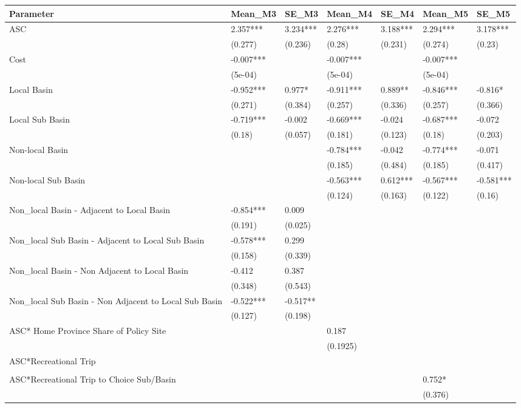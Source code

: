 \begin{table}[ht]
\centering
\begin{tabular}{lllllll}
  \hline
Parameter & Mean\_M3 & SE\_M3 & Mean\_M4 & SE\_M4 & Mean\_M5 & SE\_M5 \\ 
  \hline
ASC & 2.357*** & 3.234*** & 2.276*** & 3.188*** & 2.294*** & 3.178*** \\ 
   & (0.277) & (0.236) & (0.28) & (0.231) & (0.274) & (0.23) \\ 
  Cost & -0.007*** &  & -0.007*** &  & -0.007*** &  \\ 
   & (5e-04) &  & (5e-04) &  & (5e-04) &  \\ 
  Local Basin & -0.952*** & 0.977* & -0.911*** & 0.889** & -0.846*** & -0.816* \\ 
   & (0.271) & (0.384) & (0.257) & (0.336) & (0.257) & (0.366) \\ 
  Local Sub Basin & -0.719*** & -0.002 & -0.669*** & -0.024 & -0.687*** & -0.072 \\ 
   & (0.18) & (0.057) & (0.181) & (0.123) & (0.18) & (0.203) \\ 
  Non-local Basin &  &  & -0.784*** & -0.042 & -0.774*** & -0.071 \\ 
   &  &  & (0.185) & (0.484) & (0.185) & (0.417) \\ 
  Non-local Sub Basin &  &  & -0.563*** & 0.612*** & -0.567*** & -0.581*** \\ 
   &  &  & (0.124) & (0.163) & (0.122) & (0.16) \\ 
  Non\_local Basin - Adjacent to Local Basin & -0.854*** & 0.009 &  &  &  &  \\ 
   & (0.191) & (0.025) &  &  &  &  \\ 
  Non\_local Sub Basin - Adjacent to Local Sub Basin & -0.578*** & 0.299 &  &  &  &  \\ 
   & (0.158) & (0.339) &  &  &  &  \\ 
  Non\_local Basin - Non Adjacent to Local Basin & -0.412 & 0.387 &  &  &  &  \\ 
   & (0.348) & (0.543) &  &  &  &  \\ 
  Non\_local Sub Basin - Non Adjacent to Local Sub Basin & -0.522*** & -0.517** &  &  &  &  \\ 
   & (0.127) & (0.198) &  &  &  &  \\ 
  ASC* Home Province Share of Policy Site &  &  & 0.187 &  &  &  \\ 
   &  &  & (0.1925) &  &  &  \\ 
  ASC*Recreational Trip &  &  &  &  &  &  \\ 
   &  &  &  &  &  &  \\ 
  ASC*Recreational Trip to Choice Sub/Basin &  &  &  &  & 0.752* &  \\ 
   &  &  &  &  & (0.376) &  \\ 
   \hline
\end{tabular}
\end{table}
